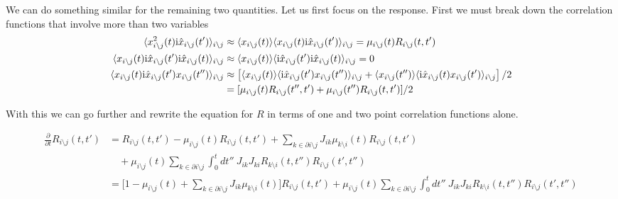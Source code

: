 \documentclass[
    preprint,
    linenumbers,
    amsmath,amssymb,amsfonts,
    aps, physrev,
    superscriptaddress,
    10pt,
    bibnotes
    ]{revtex4-2}
\begin{document}
We can do something similar for the remaining two quantities. Let us first focus on the response. First we must break down the correlation functions that involve more than two variables
\begin{subequations}
\begin{align}
\langle x_{i\setminus j}^{2}(t){\rm i}\hat{x}_{i\setminus j}(t')\rangle_{i\setminus j} & \approx \langle x_{i\setminus j}(t)\rangle \langle x_{i\setminus j}(t){\rm i}\hat{x}_{i\setminus j}(t')\rangle_{i\setminus j} =\mu_{i \setminus j}(t) R_{i \setminus j}(t,t') \\ 
\langle x_{i\setminus j}(t){\rm i}\hat{x}_{i\setminus j}(t'){\rm i}\hat{x}_{i\setminus j}(t)\rangle_{i\setminus j} &  \approx \langle x_{i\setminus j}(t)\rangle \langle {\rm i}\hat{x}_{i\setminus j}(t'){\rm i}\hat{x}_{i\setminus j}(t)\rangle_{i\setminus j} = 0 \\ 
    \langle x_{i\setminus j}(t){\rm i}\hat{x}_{i\setminus j}(t')x_{i\setminus j}(t'')\rangle_{i\setminus j}  & \approx \left[\langle x_{i\setminus j}(t)\rangle \langle {\rm i}\hat{x}_{i\setminus j}(t')x_{i\setminus j}(t'')\rangle_{i\setminus j} + \langle x_{i\setminus j}(t'')\rangle \langle {\rm i}\hat{x}_{i\setminus j}(t)x_{i\setminus j}(t')\rangle_{i\setminus j}\right]/2 \nonumber \\
    &=[\mu_{i\setminus j}(t) R_{i\setminus j}(t'',t')+\mu_{i\setminus j}(t'') R_{i\setminus j}(t,t')]/2
\end{align}
\end{subequations}

With this we can go further and rewrite the equation for $R$ in terms of one and two point correlation functions alone.


\begin{align}
  \frac{\partial}{\partial t}R_{i\setminus j}(t,t') & =R_{i\setminus j}(t,t')-
  \mu_{i \setminus j}(t) R_{i \setminus j}(t,t')
  +\sum_{k\in\partial i\setminus j}J_{ik}\mu_{k\setminus i}(t)R_{i\setminus j}(t,t')\nonumber\\
  &\quad + \mu_{i\setminus j}(t) \sum_{k\in\partial i\setminus j}\int_{0}^{t}dt''\:J_{ik}J_{ki}R_{k\setminus i}(t,t'')  R_{i\setminus j}(t',t'') \nonumber\\ 
  &= \Big[1 - \mu_{i \setminus j}(t) + \sum_{k\in\partial i\setminus j}J_{ik}\mu_{k\setminus i}(t) \Big] R_{i \setminus j}(t,t') + \mu_{i\setminus j}(t) \sum_{k\in\partial i\setminus j}\int_{0}^{t}dt''\:J_{ik}J_{ki}R_{k\setminus i}(t,t'')  R_{i\setminus j}(t',t'')
\end{align}
\end{document}
